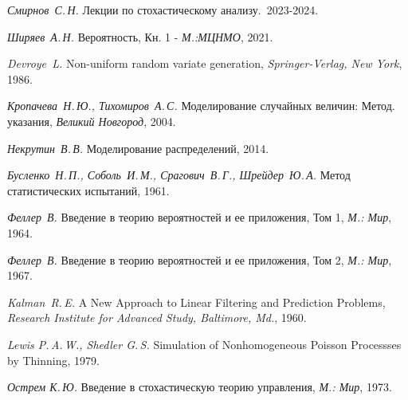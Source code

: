 \documentclass[11pt]{report}
\begin{document}
\begin{thebibliography}{99}

\textit{Смирнов~С.\,Н.}
Лекции по стохастическому анализу.~2023-2024.

\textit{Ширяев~А.\,Н.}
Вероятность, Кн. 1 - \textit{М.:МЦНМО}, 2021.

\textit{Devroye~L.}
Non-uniform random variate generation, \textit{Springer-Verlag, New York}, 1986.

\textit{Кропачева~Н.\,Ю., Тихомиров~А.\,С.}
Моделирование случайных величин: Метод. указания, \textit{Великий Новгород}, 2004.

\textit{Некрутин~В.\,В.}
Моделирование распределений, 2014.

\textit{Бусленко~Н.\,П., Соболь~И.\,М., Срагович~В.\,Г., Шрейдер~Ю.\,А.}
Метод статистических испытаний, 1961.

\textit{Феллер~В.}
Введение в теорию вероятностей и ее приложения, Том 1, \textit{М.: Мир}, 1964.

\textit{Феллер~В.}
Введение в теорию вероятностей и ее приложения, Том 2, \textit{М.: Мир}, 1967.

\textit{Kalman~R.\,E.}
A New Approach to Linear Filtering and Prediction Problems, \textit{Research Institute for Advanced Study, Baltimore, Md.}, 1960.

\textit{Lewis P.\,A.\,W., Shedler G.\,S.}
Simulation of Nonhomogeneous Poisson Processses by Thinning, 1979.

\textit{Острем К.\,Ю.}
Введение в стохастическую теорию управления, \textit{М.: Мир}, 1973.

\end{thebibliography}
\end{document}

